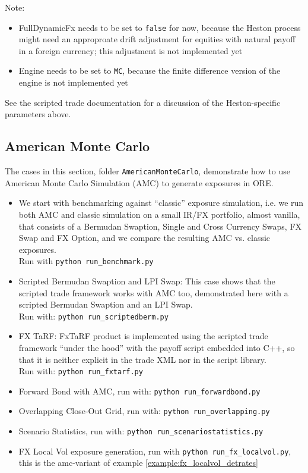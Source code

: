 Note:
\begin{itemize}
\item FullDynamicFx needs to be set to {\tt false} for now, because the Heston process might need an
  approproate drift adjustment for equities with natural payoff in a foreign currency;
  this adjustment is not implemented yet
\item Engine needs to be set to {\tt MC}, because the finite difference version of the engine
  is not implemented yet
\end{itemize}
See the scripted trade documentation for a discussion of the Heston-specific parameters above.

\subsection{American Monte Carlo}\label{example:amc}

The cases in this section, folder {\tt AmericanMonteCarlo},  demonstrate how to use American Monte Carlo Simulation (AMC)
to generate exposures in ORE.
\begin{itemize}
\item We start with benchmarking against ``classic'' exposure simulation, i.e.
  we run both AMC and classic simulation on a small IR/FX portfolio, almost vanilla, that
  consists of a Bermudan Swaption, Single and Cross Currency Swaps, FX Swap and FX Option,
  and we compare the resulting AMC vs. classic exposures. \\
  Run with {\tt python run\_benchmark.py}
\item Scripted Bermudan Swaption and LPI Swap: This case shows that the scripted trade
  framework works with AMC too, demonstrated here with a scripted Bermudan Swaption and an LPI Swap. \\
  Run with: {\tt python run\_scriptedberm.py}
\item FX TaRF: FxTaRF product is implemented using the scripted trade framework ``under the hood''
  with the payoff script embedded into C++, so that it is neither explicit in the trade XML nor
  in the script library.\\
  Run with: {\tt python run\_fxtarf.py}
\item Forward Bond with AMC, run with: {\tt python run\_forwardbond.py}
\item Overlapping Close-Out Grid, run with: {\tt python run\_overlapping.py}
\item Scenario Statistics, run with: {\tt python run\_scenariostatistics.py}
\item FX Local Vol exposure generation, run with {\tt python run\_fx\_localvol.py}, this is the amc-variant of example \ref{example:fx_localvol_detrates}
\end{itemize}

